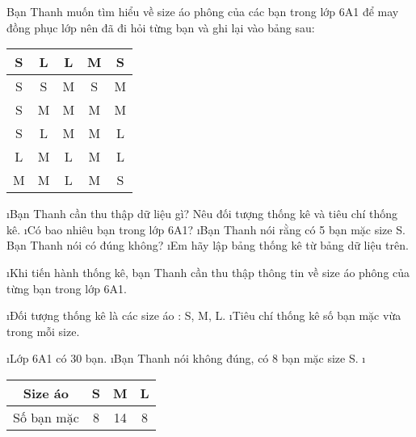 \begin{bt}
	Bạn Thanh muốn tìm hiểu về size áo phông của các bạn trong lớp 6A1 để may đồng phục lớp nên đã đi hỏi từng bạn và ghi lại vào bảng sau:
	\begin{center}
		\begin{tabular}{|c|c|c|c|c|}
			\hline
			S&	L&	L&	M&	S\\
			\hline
			S&	S&	M&	S&	M\\
			\hline
			S&	M&	M&	M&	M\\
			\hline
			S&	L&	M&	M&	L\\
			\hline
			L&	M&	L&	M&	L\\
			\hline
			M&	M&	L&	M&	S\\
			\hline
		\end{tabular}
	\end{center}
	\begin{enumerate}[a),leftmargin=*]
		\i Bạn Thanh cần thu thập dữ liệu gì? Nêu đối tượng thống kê và tiêu chí thống kê.
		\i Có bao nhiêu bạn trong lớp 6A1?
		\i Bạn Thanh nói rằng có 5 bạn mặc size S. Bạn Thanh nói có đúng không?
		\i Em hãy lập bảng thống kê từ bảng dữ liệu trên.
	\end{enumerate}
	\begin{loigiaichuong39}
		\begin{enumerate}[a),leftmargin=*]
			\i Khi tiến hành thống kê, bạn Thanh cần thu thập thông tin về size áo phông của từng bạn trong lớp 6A1.
			\begin{enumerate}[+,leftmargin=*]
				\i Đối tượng thống kê là các size áo : S, M, L.
				\i Tiêu chí thống kê số bạn mặc vừa trong mỗi size.
			\end{enumerate}
			\i Lớp 6A1 có 30 bạn.
			\i Bạn Thanh nói không đúng, có 8 bạn mặc size S.
			\i 
			\begin{tabular}{|c|c|c|c|}
				\hline
				Size áo &	S&	M&	L\\
				\hline
				Số bạn mặc&	8&	14&	8\\
				\hline
			\end{tabular}
		\end{enumerate}
	\end{loigiaichuong39}
\end{bt}
